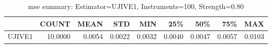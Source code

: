 \begin{table}[ht]
\centering
\caption{mse summary: Estimator=UJIVE1, Instruments=100, Strength=0.80}
\begin{tabular}{lrrrrrrrr}
\toprule
 & COUNT & MEAN & STD & MIN & 25\% & 50\% & 75\% & MAX \\
\midrule
UJIVE1 & 10.0000 & 0.0054 & 0.0022 & 0.0032 & 0.0040 & 0.0047 & 0.0057 & 0.0103 \\
\bottomrule
\end{tabular}
\end{table}
